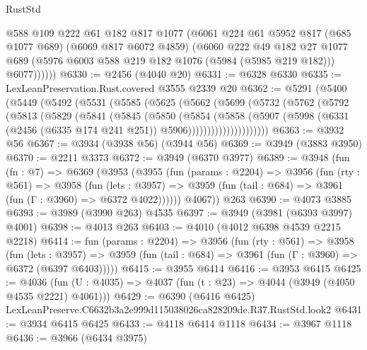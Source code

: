 \begin{lexlean}{RustStd}
\begin{coremodule}
            @588
            @109
            @222
            @61
            @182
            @817
            @1077
            (@6061
              @224
              @61
              @5952
              @817
              (@685 @1077 @689)
              (@6069 @817 @6072 @4859)
              (@6060
                @222
                @49
                @182
                @27
                @1077
                @689
                (@5976 @6003 @588 @219 @182 @1076 (@5984 (@5985 @219 @182)))
                @6077))))))
@6330 := @2456 (@4040 @20)
@6331 := @6328 @6330
@6335 := LexLeanPreservation.Rust.covered @3555 @2339 @20
@6362 := @5291
    (@5400
      (@5449
        (@5492
          (@5531
            (@5585
              (@5625
                (@5662
                  (@5699
                    (@5732
                      (@5762
                        (@5792
                          (@5813
                            (@5829
                              (@5841
                                (@5845
                                  (@5850
                                    (@5854
                                      (@5858
                                        (@5907
                                          (@5998
                                            (@6331
                                              (@2456 (@6335 @174 @241 @251))
                                              @5906)))))))))))))))))))))
@6363 := @3932 @56
@6367 := @3934 (@3938 @56) (@3944 @56)
@6369 := @3949 (@3883 @3950)
@6370 := @2211 @3373
@6372 := @3949 (@6370 @3977)
@6389 := @3948
    (fun (fn : @7) =>
    @6369
      (@3953
        (@3955
          (fun (params : @2204) =>
          @3956
            (fun (rty : @561) =>
            @3958
              (fun (lets : @3957) =>
              @3959 (fun (tail : @684) => @3961 (fun (Γ : @3960) => @6372 @4022))))))
        @4067))
    @263
@6390 := @4073 @3885
@6393 := @3989 (@3990 @263) @4535
@6397 := @3949 (@3981 (@6393 @3997) @4001)
@6398 := @4013 @263
@6403 := @4010 (@4012 @6398 @4539 @2215 @2218)
@6414 := fun (params : @2204) =>
  @3956
    (fun (rty : @561) =>
    @3958
      (fun (lets : @3957) =>
      @3959 (fun (tail : @684) => @3961 (fun (Γ : @3960) => @6372 (@6397 @6403)))))
@6415 := @3955 @6414
@6416 := @3953 @6415
@6425 := @4036 (fun (U : @4035) => @4037 (fun (t : @23) => @4044 (@3949 (@4050 @4535 @2221) @4061)))
@6429 := @6390 (@6416 @6425) LexLeanPreserve.C6632b3a2e999d115038026ca828209de.R37.RustStd.look2
@6431 := @3934 @6415 @6425
@6433 := @4118 @6414 @1118
@6434 := @3967 @1118
@6436 := @3966 (@6434 @3975)

\end{coremodule}
\end{lexlean}
